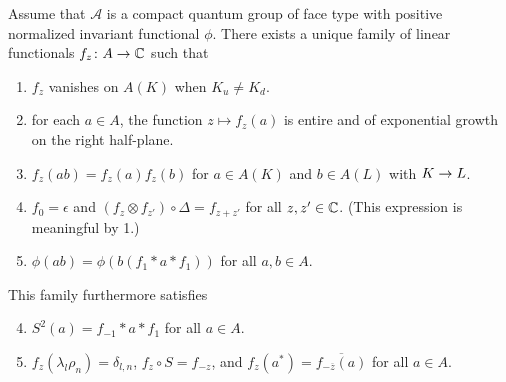 \begin{Theorem} \label{thm:rep-characters}
  Assume that $\mathscr{A}$ is a compact quantum group of face type with positive normalized
  invariant functional $\phi$.  There exists a unique family of linear functionals
  $f_{z} \colon A\to \mathbb{C}$ such that
  \begin{enumerate}
  \item $f_z$ vanishes on $A(K)$ when $K_u\neq K_d$.
  \item for each $a\in A$, the function $z\mapsto f_{z}(a)$ is entire
    and of exponential growth on the right half-plane.
  \item $f_z(ab) = f_z(a)f_z(b)$ for $a\in A(K)$ and $b\in A(L)$ with $K\rightarrow L$. 
  \item $f_{0} = \epsilon$ and $(f_{z} \otimes f_{z'}) \circ 
    \Delta= f_{z+z'}$ for all $z,z' \in \mathbb{C}$. (This expression is meaningful by 1.)
  \item $\phi(ab)=\phi(b(f_{1} \ast a \ast f_{1}))$ for all $a,b\in A$.
  \end{enumerate}
  This family furthermore satisfies
  \begin{enumerate}\setcounter{enumi}{3}
  \item $S^{2}(a)=f_{-1} \ast a \ast f_{1}$ for all $a\in A$.
  \item $f_{z}(\lambda_{l}\rho_{n})=\delta_{l,n}$,  $f_{z} \circ S = f_{-z}$,
and    $f_{z}(a^*) = \overline{f_{-\overline{z}}(a)}$ for all $a\in A$.
\end{enumerate}
\end{Theorem}

